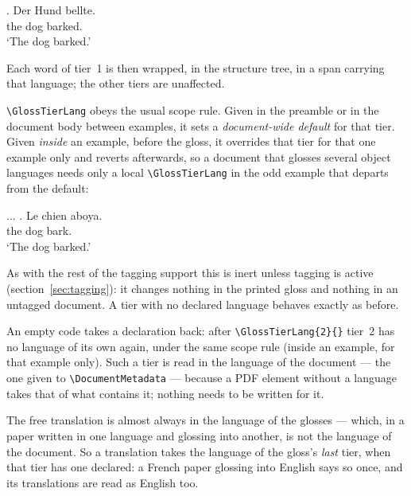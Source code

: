 \documentclass[11pt,a4paper]{article}
\newcommand{\cs}[1]{\texttt{\textbackslash #1}}
\begin{document}
\begin{code}
\ex.
\gll Der Hund bellte.\\ the dog barked.\\
\glt `The dog barked.'
\end{code}

\noindent Each word of tier~1 is then wrapped, in the structure tree, in a
span carrying that language; the other tiers are unaffected.

\cs{GlossTierLang} obeys the usual scope rule. Given in the preamble or in
the document body between examples, it sets a \emph{document-wide default}
for that tier. Given \emph{inside} an example, before the gloss, it
overrides that tier for that one example only and reverts afterwards, so a
document that glosses several object languages needs only a local
\cs{GlossTierLang} in the odd example that departs from the default:

\begin{code}
...
\ex.
\gll Le chien aboya.\\ the dog bark.\\
\glt `The dog barked.'
\end{code}

\noindent As with the rest of the tagging support this is inert unless
tagging is active (section~\ref{sec:tagging}): it changes nothing in the
printed gloss and nothing in an untagged document. A tier with no declared
language behaves exactly as before.

An empty code takes a declaration back: after
\verb|\GlossTierLang{2}{}| tier~2 has no language of its own again, under
the same scope rule (inside an example, for that example only). Such a
tier is read in the language of the document --- the one given to
\cs{DocumentMetadata} --- because a PDF element without a language takes
that of what contains it; nothing needs to be written for it.

The free translation is almost always in the language of the glosses ---
which, in a paper written in one language and glossing into another, is
not the language of the document. So a translation takes the language of
the gloss's \emph{last} tier, when that tier has one declared: a French
paper glossing into English says so once, and its translations are read
as English too.

\begin{code}
\end{code}
\end{document}
